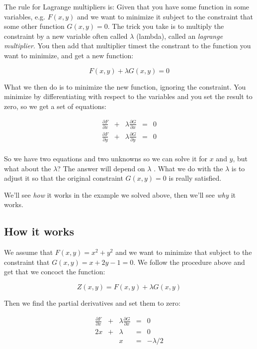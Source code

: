 \documentclass[a4, 12pt, english, USenglish]{scrreprt}
\newcommand{\idx}[1]{{\em #1}\index{#1}}
\begin{document}
The rule for Lagrange multipliers is: Given that you have some
function in some variables, e.g. \(F(x,y)\)   and we want to minimize
it subject to the constraint that some other function \(G(x,y) = 0\).
The trick you take is to multiply the constraint by a new variable
often called \(\lambda\) (lambda), called an \idx{lagrange
  multiplier}.  You then add that multiplier timest the constrant to
the function you want to minimize, and get a new function:

\[
  F(x, y) + \lambda G(x,y) = 0
\]

What we then do is to  minimize the new  function, ignoring the
constraint.  You minimize by differentiating with respect to the
variables and you set the result to zero, so we get a set of equations:

\[
\begin{array}{lclcl}
\frac{\partial{F}}{\partial{x}} &+& \lambda \frac{\partial{G}}{\partial{x}} &=& 0 \\
\frac{\partial{F}}{\partial{y}} &+& \lambda \frac{\partial{G}}{\partial{y}} &=& 0 \\
\end{array}
\]

So we have two equations and two unknowns so we can solve it for \(x\) and
\(y\), but what about the \(\lambda\)?  The answer will depend on
\(\lambda\) . What we do with the \(\lambda\) is to adjust it so that
the original constraint \(G(x,y) = 0\) is really satisfied.

We'll see {\em how} it works in the example we solved above, then we'll see
{\em why} it works.

\subsection{How it works}

We assume that \(F(x,y) = x^2 + y^2\) and we want to minimize that
subject to the constraint that \(G(x,y) = x + 2y -1 = 0 \).  We follow
the procedure above and get that we concoct the function:

\[
Z (x,y) =   F(x, y) + \lambda G(x,y)
\]

Then  we  find the partial derivatives and set them to zero:

\[
\begin{array}{lclcl}
\frac{\partial{F}}{\partial{x}} &+& \lambda\frac{\partial{G}}{\partial{x}} &=& 0 \\
2x &+& \lambda &=&0\\
&& x &=& - \lambda/2\\
\end{array}
\]
\end{document}

